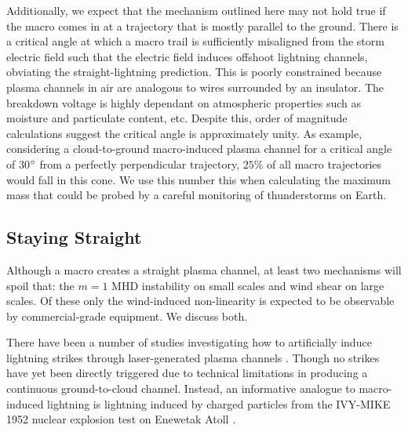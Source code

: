 \documentclass[%
 reprint,
 amsmath,amssymb,
 aps,
]{revtex4-2}
\begin{document}
        Additionally, we expect that the mechanism outlined here may not hold true if the macro comes in at a trajectory that is mostly parallel to the ground. There is a critical angle at which a macro trail is sufficiently misaligned from the storm electric field such that the electric field induces offshoot lightning channels, obviating the straight-lightning prediction. This is poorly constrained because plasma channels in air are analogous to wires surrounded by an insulator. The breakdown voltage is highly dependant on atmospheric properties such as moisture and particulate content, etc. Despite this, order of magnitude calculations suggest the critical angle is approximately unity. As example, considering a cloud-to-ground macro-induced plasma channel for a critical angle of 30$\degree$ from a perfectly perpendicular trajectory, $25\%$ of all macro trajectories would fall in this cone. We use this number this when calculating the maximum mass that could be probed by a careful monitoring of thunderstorms on Earth.



    \subsection{Staying Straight} %
    \label{sub:staying_straight}

        Although a macro creates a straight plasma channel, at least two mechanisms will spoil that: the $m=1$ MHD instability on small scales and wind shear on large scales. Of these only the wind-induced non-linearity is expected to be observable by commercial-grade equipment. We discuss both.

        There have been a number of studies investigating how to artificially induce lightning strikes through laser-generated plasma channels \citep[see][]{Kasparian2008}. Though no strikes have yet been directly triggered due to technical limitations in producing a continuous ground-to-cloud channel. Instead, an informative analogue to macro-induced lightning is lightning induced by charged particles from the IVY-MIKE 1952 nuclear explosion test on Enewetak Atoll \citep{IVY-MIKE1987}. 
\end{document}
